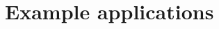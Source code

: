 \documentclass[hidelinks]{article}
\begin{document}

    




\section*{Example applications}
    \label{additions}
\end{document}

